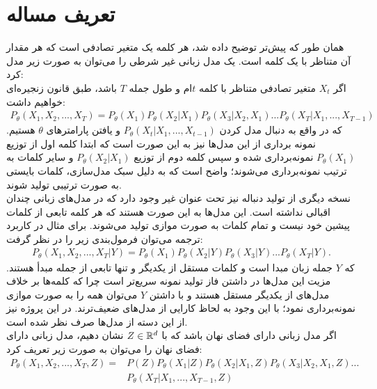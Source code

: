 \section{تعریف مساله} \label{chap1:prob_define}
همان طور که پیش‌تر توضیح داده شد، هر کلمه یک متغیر تصادفی است که هر مقدار آن متناظر با یک کلمه است. یک مدل زبانی غیر شرطی \autoregressive{} را می‌توان به صورت زیر مدل کرد:\\
اگر $X_t$ متغیر تصادفی متناظر با کلمه $t$ام و طول جمله $T$ باشد، طبق قانون زنجیره‌ای خواهیم داشت:
\begin{equation}\begin{split}
		P_\theta(X_1, X_2, ... , X_T) = P_\theta(X_1) P_\theta(X_2|X_1) P_\theta(X_3|X_2, X_1) ... P_\theta(X_T|X_1, ..., X_{T-1})
	\end{split}\end{equation}
که در واقع به دنبال مدل کردن $P_\theta(X_t|X_1, ..., X_{t-1 })$ و یافتن پارامتر‌های $\theta$ هستیم. نمونه برداری از این مدل‌ها نیز به این صورت است که ابتدا کلمه اول از توزیع $P_\theta(X_1)$ نمونه‌برداری شده و سپس کلمه دوم از توزیع $P_\theta(X_2|X_1)$ و سایر کلمات به ترتیب نمونه‌برداری می‌شوند؛ واضح است که به دلیل سبک مدل‌سازی، کلمات بایستی به صورت ترتیبی تولید شوند. \\
نسخه دیگری از تولید دنباله نیز تحت عنوان غیر \autoregressive{} وجود دارد که در مدل‌های زبانی چندان اقبالی نداشته است. این مدل‌ها به این صورت هستند که هر کلمه تابعی از کلمات پیشین خود نیست و تمام کلمات به صورت موازی تولید می‌شوند. برای مثال در کاربرد ترجمه می‌توان فرمول‌بندی زیر را در نظر گرفت:
\begin{align}
	P_\theta(X_1, X_2, ... , X_T|Y) = P_\theta(X_1) P_\theta(X_2|Y) P_\theta(X_3|Y) ... P_\theta(X_T|Y).
\end{align}
که $Y$ جمله زبان مبدا است و کلمات مستقل از یکدیگر و تنها تابعی از جمله مبدأ هستند. مزیت این مدل‌ها در داشتن فاز تولید نمونه سریع‌تر است چرا که کلمه‌ها بر خلاف مدل‌های \autoregressive{} از یکدیگر مستقل هستند و با داشتن $Y$ می‌توان همه را به صورت موازی نمونه‌برداری نمود؛ با این وجود به لحاظ کارایی از مدل‌های \autoregressive{} ضعیف‌ترند. در این پروژه نیز از این دسته از مدل‌ها صرف نظر شده است.
\\
اگر مدل زبانی دارای فضای نهان باشد که با $Z \in {\mathbb{R}}^d$ نشان دهیم، مدل زبانی \autoregressive{} دارای فضای نهان را می‌توان به صورت زیر تعریف کرد:
\begin{align}
	P_\theta(X_1, X_2, ... , X_T,Z) = & P(Z) P_\theta(X_1|Z) P_\theta(X_2|X_1,Z) P_\theta(X_3|X_2, X_1,Z) ... \nonumber \\& P_\theta(X_T|X_1, ..., X_{T-1},Z)
\end{align}
